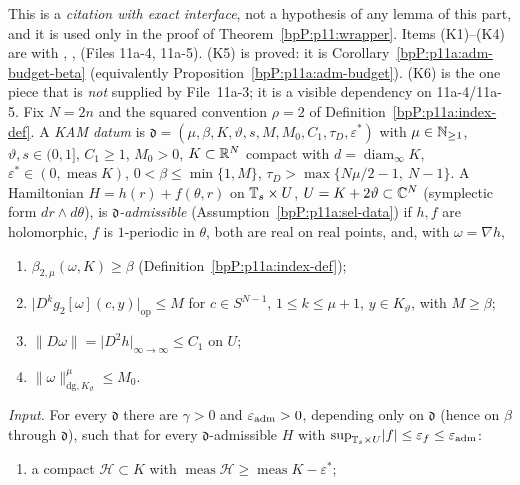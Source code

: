 \begin{definition}\label{bpP:p11:kam-input}
This is a \emph{citation with exact interface}, not a hypothesis of any lemma of this part, and it is used only in the proof of Theorem~\ref{bpP:p11:wrapper}. Items (K1)--(K4) are  with , ,  (Files 11a-4, 11a-5). (K5) is proved: it is Corollary~\ref{bpP:p11a:adm-budget-beta} (equivalently Proposition~\ref{bpP:p11a:adm-budget}). (K6) is the one piece that is \emph{not} supplied by File~11a-3; it is a visible dependency on 11a-4/11a-5. Fix $N=2n$ and the squared convention $\rho=2$ of Definition~\ref{bpP:p11a:index-def}. A \emph{KAM datum} is $\mathfrak d=(\mu,\beta,K,\vartheta,s,M,M_0,C_1,\tau_D,\varepsilon^*)$ with $\mu\in\mathbb{N}_{\ge1}$, $\vartheta,s\in(0,1]$, $C_1\ge1$, $M_0>0$, $K\subset\mathbb{R}^N$ compact with $d=\operatorname{diam}_\infty K$, $\varepsilon^*\in(0,\operatorname{meas}K)$, $0<\beta\le\min\{1,M\}$, $\tau_D>\max\{N\mu/2-1,\ N-1\}$. A Hamiltonian $H=h(r)+f(\theta,r)$ on $\mathbb{T}_s\times U$, $U=K+2\vartheta\subset\mathbb{C}^N$ (symplectic form $dr\wedge d\theta$), is \emph{$\mathfrak d$-admissible} (Assumption~\ref{bpP:p11a:sel-data}) if $h,f$ are holomorphic, $f$ is $1$-periodic in $\theta$, both are real on real points, and, with $\omega=\nabla h$,
\begin{enumerate}[label=(A\arabic*)]
\item $\beta_{2,\mu}(\omega,K)\ge\beta$ (Definition~\ref{bpP:p11a:index-def}); \item $\lvert D^kg_2[\omega](c,y)\rvert_{\mathrm{op}}\le M$ for $c\in S^{N-1}$, $1\le k\le\mu+1$, $y\in K_\vartheta$, with $M\ge\beta$; \item $\lVert D\omega\rVert=\lvert D^2h\rvert_{\infty\to\infty}\le C_1$ on $U$; \item $\lVert\omega\rVert^\mu_{\mathrm{dg},K_\vartheta}\le M_0$.
\end{enumerate}
\emph{Input.} For every $\mathfrak d$ there are $\gamma>0$ and $\varepsilon_{\rm adm}>0$, depending only on $\mathfrak d$ (hence on $\beta$ through $\mathfrak d$), such that for every $\mathfrak d$-admissible $H$ with $\sup_{\mathbb{T}_s\times U}\lvert f\rvert\le\varepsilon_f\le\varepsilon_{\rm adm}$:
\begin{enumerate}[label=(K\arabic*)]
\item a compact $\mathcal H\subset K$ with $\operatorname{meas}\mathcal H\ge\operatorname{meas}K-\varepsilon^*$;

\end{enumerate}
\end{definition}

